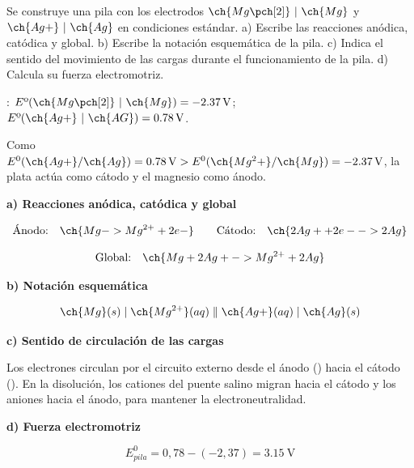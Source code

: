 \begin{exerciseEVAU}
    Se construye una pila con los electrodos \(\ch{Mg\pch[2]}\ | \ \ch{Mg}\) y \(\ch{Ag+}\ |\ \ch{Ag}\) en condiciones estándar. a) Escribe las reacciones anódica, catódica y global. b) Escribe la notación esquemática de la pila. c) Indica el sentido del movimiento de las cargas durante el funcionamiento de la pila. d) Calcula su fuerza electromotriz.

    \datos{}: \( E\text{º}(\ch{Mg\pch[2]}\ | \ \ch{Mg}) = \SI{-2.37}{\volt} \); \( E\text{º}(\ch{Ag+}\ | \ \ch{AG}) = \SI{0.78}{\volt} \).

    \begin{solu}


        Como \(E^0(\ch{Ag+}/\ch{Ag}) = \SI{0.78}{\volt} > E^0(\ch{Mg^2+}/\ch{Mg}) = \SI{-2.37}{\volt}\), la plata actúa como cátodo y el magnesio como ánodo.

        \textbf{a) Reacciones anódica, catódica y global}

        \begin{equation*}
            \text{Ánodo:} \quad \ch{Mg -> Mg^{2+} + 2 e-} \qquad \text{Cátodo:} \quad \ch{2 Ag+ + 2 e- -> 2 Ag}
        \end{equation*}

        \begin{equation*}
            \text{Global:} \quad \ch{Mg + 2 Ag+ -> Mg^{2+} + 2 Ag}
        \end{equation*}

        \textbf{b) Notación esquemática}

        \begin{equation*}
            \ch{Mg}(s) \mid \ch{Mg^{2+}}(aq) \parallel \ch{Ag+}(aq) \mid \ch{Ag}(s)
        \end{equation*}

        \textbf{c) Sentido de circulación de las cargas}

        Los electrones circulan por el circuito externo desde el ánodo () hacia el cátodo (). En la disolución, los cationes del puente salino migran hacia el cátodo y los aniones hacia el ánodo, para mantener la electroneutralidad.

        \textbf{d) Fuerza electromotriz}

        \begin{equation*}
            E^0_{pila} = 0,78-(-2,37) = \SI{3.15}{\volt}
        \end{equation*}

    \end{solu}
\end{exerciseEVAU}

